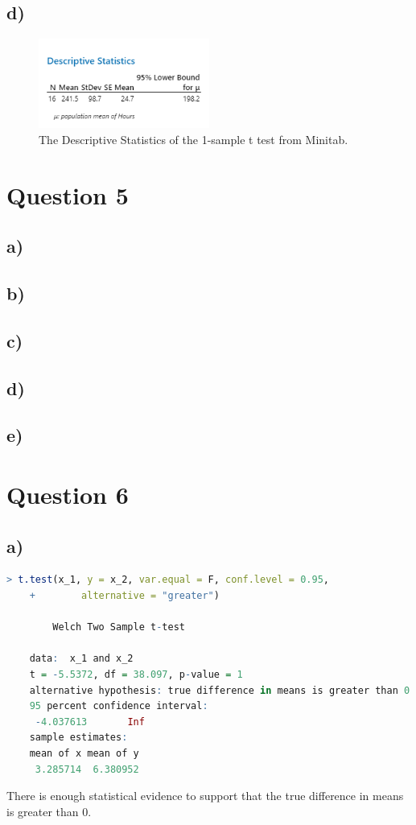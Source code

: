 \documentclass{article}
\begin{document}
\subsection*{d)}
\begin{figure}[h]
    \centering
    \includegraphics[width=0.5\textwidth]{./hw_1/images/4_a.png}
    \caption{The Descriptive Statistics of the 1-sample t test from Minitab.}
    \label{fig:4_b}
  \end{figure}



\section*{Question 5}

\subsection*{a)}
\subsection*{b)}
\subsection*{c)}
\subsection*{d)}
\subsection*{e)}

\section*{Question 6}

\subsection*{a)}
\begin{lstlisting}[language=R, caption=Calculating the P-value for a $t_0$ value, basicstyle=\small]
    > t.test(x_1, y = x_2, var.equal = F, conf.level = 0.95,
    +        alternative = "greater")
    
        Welch Two Sample t-test
    
    data:  x_1 and x_2
    t = -5.5372, df = 38.097, p-value = 1
    alternative hypothesis: true difference in means is greater than 0
    95 percent confidence interval:
     -4.037613       Inf
    sample estimates:
    mean of x mean of y 
     3.285714  6.380952 
    \end{lstlisting}
    There is enough statistical evidence to support that the true difference in means is greater than 0.
\end{document}
